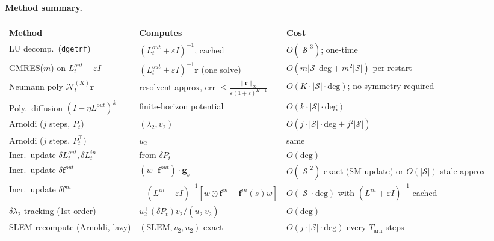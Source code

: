\documentclass[10pt,a4paper]{article}
\begin{document}
\paragraph{Method summary.}
\begin{center}
\renewcommand{\arraystretch}{1.15}
\begin{tabular}{p{5.0cm}p{5.0cm}p{4.5cm}}
\toprule
Method & Computes & Cost \\
\midrule
LU decomp.\ (\texttt{dgetrf}) & $(L^{out}_t+\varepsilon I)^{-1}$, cached & $O(|\mathcal{S}|^3)$; one-time \\
GMRES($m$) on $L^{out}_t\!+\!\varepsilon I$ & $(L^{out}_t+\varepsilon I)^{-1}\mathbf{r}$ (one solve) & $O(m|\mathcal{S}|\,\mathrm{deg}+m^2|\mathcal{S}|)$ per restart \\
Neumann poly $\mathcal{N}^{(K)}_t\mathbf{r}$ & resolvent approx, err $\leq\frac{\|\mathbf{r}\|_\infty}{\varepsilon(1+\varepsilon)^{K+1}}$ & $O(K\!\cdot\!|\mathcal{S}|\!\cdot\!\mathrm{deg})$; no symmetry required \\
Poly.\ diffusion $(I\!-\!\eta L^{out})^k$ & finite-horizon potential & $O(k\!\cdot\!|\mathcal{S}|\!\cdot\!\mathrm{deg})$ \\
\midrule
Arnoldi ($j$ steps, $P_t$) & $(\lambda_2, v_2)$ & $O(j\!\cdot\!|\mathcal{S}|\!\cdot\!\mathrm{deg}+j^2|\mathcal{S}|)$ \\
Arnoldi ($j$ steps, $P_t^\top$) & $u_2$ & same \\
\midrule
Incr.\ update $\delta L^{out}_t,\delta L^{in}_t$ & from $\delta P_t$ & $O(\mathrm{deg})$ \\
Incr.\ update $\delta\mathbf{f}^{out}$ & $(w^\top\mathbf{f}^{out})\cdot\mathbf{g}_s$ & $O(|\mathcal{S}|^2)$ exact (SM update) or $O(|\mathcal{S}|)$ stale approx \\
Incr.\ update $\delta\mathbf{f}^{in}$ & $-(L^{in}\!+\!\varepsilon I)^{-1}[w\!\odot\!\mathbf{f}^{in}\!-\!\mathbf{f}^{in}(s)w]$ & $O(|\mathcal{S}|\!\cdot\!\mathrm{deg})$ with $(L^{in}\!+\!\varepsilon I)^{-1}$ cached \\
$\delta\lambda_2$ tracking (1st-order) & $u_2^\top(\delta P_t)v_2/(u_2^\top v_2)$ & $O(\mathrm{deg})$ \\
SLEM recompute (Arnoldi, lazy) & $(\mathrm{SLEM},v_2,u_2)$ exact & $O(j\!\cdot\!|\mathcal{S}|\!\cdot\!\mathrm{deg})$ every $T_{\mathrm{arn}}$ steps \\
\bottomrule
\end{tabular}
\end{center}
\end{document}
